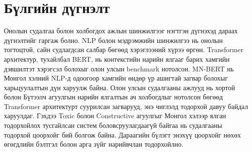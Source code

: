 \section{Бүлгийн дүгнэлт}

Онолын судалгаа болон холбогдох ажлын шинжилгээг нэгтгэн дүгнэхэд дараах
дүгнэлтийг гаргаж болно. NLP болон мэдрэмжийн шинжилгээ нь онолын тогтоцтой,
сайн судлагдсан салбар бөгөөд хэрэглээний хүрээ өргөн. Transformer архитектур,
тухайлбал BERT, нь контекстийн нарийн ялгааг барих хамгийн дэвшилтэт хэрэгсэл
болохыг олон улсын benchmark нотолсон. MN-BERT нь Монгол хэлний NLP-д одоогоор
хамгийн өндөр үр ашигтай загвар болохыг харьцуулалтын дүн харуулж байна.
Олон улсын судалгааны ажлууд нь хортой болон Бүтээлч агуулгын нарийн ялгалтын
ач холбогдлыг нотолсон бөгөөд Transformer архитектурт суурилсан загварууд, энэ
чиглэлд тодорхой давуу байдал харуулдаг. Гэхдээ Toxic болон Constructive
агуулгыг Монгол хэлээр ялган тодорхойлох тусгайлсан систем боловсруулагдаагүй
байгаа нь судалгааны тодорхой цоорхойг бий болгож байна. Дараагийн бүлэгт
энэхүү цоорхойг нөхөх өгөгдлийн бэлтгэл болон арга зүйг нарийвчлан
тодорхойлно.
